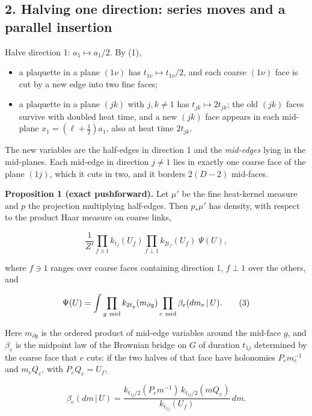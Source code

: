 \documentclass[11pt,a4paper]{article}
\newcommand{\tightlist}{\setlength{\itemsep}{0pt}\setlength{\parskip}{0pt}}
\begin{document}
\hypertarget{halving-one-direction-series-moves-and-a-parallel-insertion}{%
\subsection{2. Halving one direction: series moves and a parallel
insertion}\label{halving-one-direction-series-moves-and-a-parallel-insertion}}

Halve direction 1: \(a_1\mapsto a_1/2\). By (1),

\begin{itemize}
\tightlist
\item
  a plaquette in a plane \((1\nu)\) has \(t_{1\nu}\mapsto t_{1\nu}/2\),
  and each coarse \((1\nu)\) face is cut by a new edge into two fine
  faces;
\item
  a plaquette in a plane \((jk)\) with \(j,k\ne1\) has
  \(t_{jk}\mapsto2t_{jk}\); the old \((jk)\) faces survive with doubled
  heat time, and a new \((jk)\) face appears in each mid-plane
  \(x_1=(\ell+\tfrac12)a_1\), also at heat time \(2t_{jk}\).
\end{itemize}

The new variables are the half-edges in direction 1 and the
\emph{mid-edges} lying in the mid-planes. Each mid-edge in direction
\(j\ne1\) lies in exactly one coarse face of the plane \((1j)\), which
it cuts in two, and it borders \(2(D-2)\) mid-faces.

\textbf{Proposition 1 (exact pushforward).} Let \(\mu'\) be the fine
heat-kernel measure and \(p\) the projection multiplying half-edges.
Then \(p_*\mu'\) has density, with respect to the product Haar measure
on coarse links,

\[\frac1{Z'}\prod_{f\ni1}k_{t_f}(U_f)\prod_{f\perp1}k_{2t_f}(U_f)\;
\Psi(U), \tag{2}\]

where \(f\ni1\) ranges over coarse faces containing direction 1,
\(f\perp1\) over the others, and

\[\Psi(U)=\int\prod_{g\ \rm mid}k_{2t_g}(m_{\partial g})
\prod_{e\ \rm mid}\beta_e(dm_e\,|\,U). \tag{3}\]

Here \(m_{\partial g}\) is the ordered product of mid-edge variables
around the mid-face \(g\), and \(\beta_e\) is the midpoint law of the
Brownian bridge on \(G\) of duration \(t_{1j}\) determined by the coarse
face that \(e\) cuts: if the two halves of that face have holonomies
\(P_em_e^{-1}\) and \(m_eQ_e\), with \(P_eQ_e=U_f\),

\[\beta_e(dm\,|\,U)=\frac{k_{t_{1j}/2}(P_em^{-1})\,
k_{t_{1j}/2}(mQ_e)}{k_{t_{1j}}(U_f)}\,dm. \tag{4}\]
\end{document}
